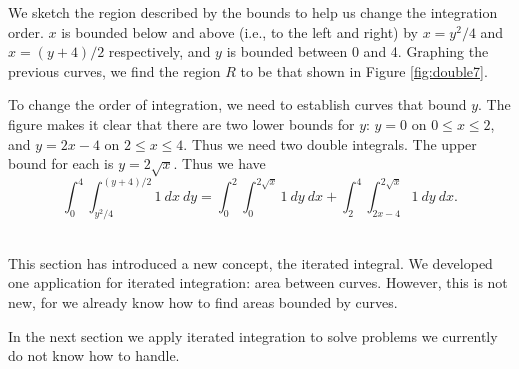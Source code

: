 {We sketch the region described by the bounds to help us change the integration order. $x$ is bounded below and above (i.e., to the left and right) by $x=y^2/4$ and $x=(y+4)/2$ respectively, and $y$ is bounded between 0 and 4. Graphing the previous curves, we find the region $R$ to be that shown in Figure \ref{fig:double7}. 

To change the order of integration, we need to establish curves that bound $y$. The figure makes it clear that there are two lower bounds for $y$: $y=0$ on $0\leq x\leq 2$, and $y=2x-4$ on $2\leq x\leq 4$. Thus we need two double integrals. The upper bound for each is $y=2\sqrt{x}$. Thus we have
$$\int_0^4\int_{y^2/4}^{(y+4)/2}1\ dx\ dy = \int_0^2\int_0^{2\sqrt{x}} 1\ dy\ dx + \int_2^4\int_{2x-4}^{2\sqrt{x}}1\ dy\ dx.$$
}\\

This section has introduced a new concept, the iterated integral. We developed one application for iterated integration: area between curves. However, this is not new, for we already know how to find areas bounded by curves.

In the next section we apply iterated integration to solve problems we currently do not know how to handle.

